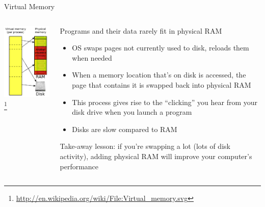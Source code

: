 \documentclass{beamer}
\begin{document}
\begin{frame}{Virtual Memory}

\begin{columns}
\begin{column}{2.2in}
\begin{center}
\includegraphics[width=1.8in]{virtual-memory.png}\footnote{\url{http://en.wikipedia.org/wiki/File:Virtual_memory.svg}}
\end{center}
\end{column}
\begin{column}{2.6in}
Programs and their data rarely fit in physical RAM
\begin{itemize}
\item OS swaps pages not currently used to disk, reloads them when
  needed
\item When a memory location that's on disk is accessed, the page that
  contains it is swapped back into physical RAM
\item This process gives rise to the ``clicking'' you hear from your
  disk drive when you launch a program
\item Disks are slow compared to RAM
\end{itemize}
Take-away lesson: if you're swapping a lot (lots of disk activity),
adding physical RAM will improve your computer's performance
\end{column}
\end{columns}
\end{frame}
\end{document}
